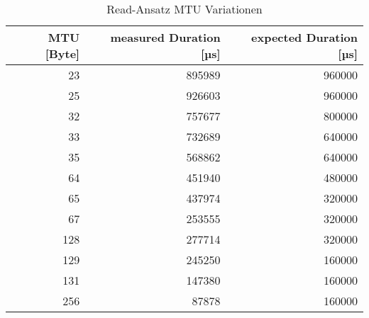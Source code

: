 \begin{table}
\centering
\caption{Read-Ansatz MTU Variationen}
\label{table:readdetailmtuchange}
\begin{tabular}{rrr}
\toprule
 MTU [Byte] &  measured Duration [µs] &  expected Duration [µs] \\
\midrule
       23 &             895989 &             960000 \\
       25 &             926603 &             960000 \\
       32 &             757677 &             800000 \\
       33 &             732689 &             640000 \\
       35 &             568862 &             640000 \\
       64 &             451940 &             480000 \\
       65 &             437974 &             320000 \\
       67 &             253555 &             320000 \\
      128 &             277714 &             320000 \\
      129 &             245250 &             160000 \\
      131 &             147380 &             160000 \\
      256 &              87878 &             160000 \\
\bottomrule
\end{tabular}
\end{table}
